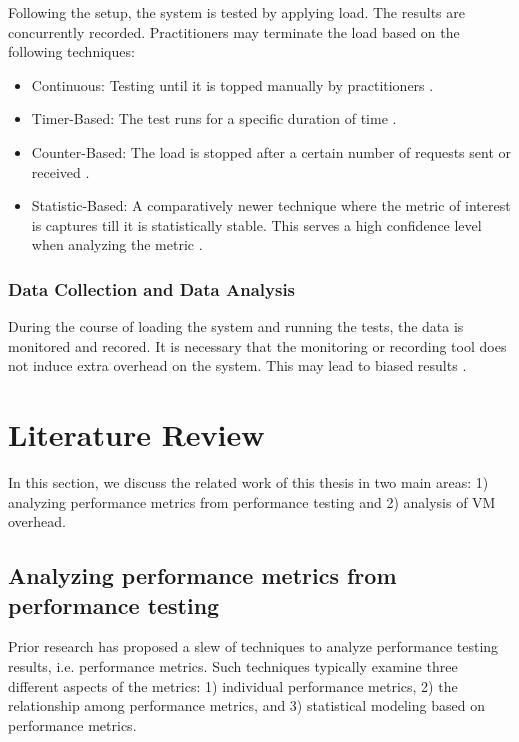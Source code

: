 Following the setup, the system is tested by applying load. The results are concurrently recorded. Practitioners may terminate the load based on the following techniques:

\begin{itemize}
\item Continuous: Testing until it is topped manually by practitioners \cite{4017687}.
\item Timer-Based: The test runs for a specific duration of time \cite{4017687}.
\item Counter-Based: The load is stopped after a certain number of requests sent or received \cite{4017687}.
\item Statistic-Based: A comparatively newer technique where the metric of interest is captures till it is statistically stable. This serves a high confidence level when analyzing the metric \cite{mansharamani2010performance,snellman2011towards}.
\end{itemize}

\subsubsection{Data Collection and Data Analysis}

During the course of loading the system and running the tests, the data is monitored and recored. It is necessary that the monitoring or recording tool does not induce extra overhead on the system. This may lead to biased results \cite{mytkowicz2010evaluating}.

\section{Literature Review}

In this section, we discuss the related work of this thesis in two main areas: 1) analyzing performance metrics from performance testing and 2) analysis of VM overhead.


\subsection{Analyzing performance metrics from performance testing} 

Prior research has proposed a slew of techniques to analyze performance testing results, i.e. performance metrics. Such techniques typically examine three different aspects of the metrics: 1) individual performance metrics, 2) the relationship among performance metrics, and 3) statistical modeling based on performance metrics.


